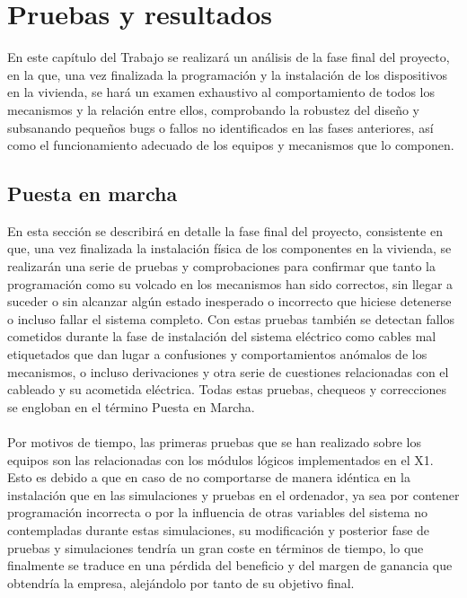 \chapter{Pruebas y resultados}

En este capítulo del Trabajo se realizará un análisis de la fase final del proyecto, en la que, una vez finalizada la programación y la instalación de los dispositivos en la vivienda, se hará un examen exhaustivo al comportamiento de todos los mecanismos y la relación entre ellos,  comprobando la robustez del diseño y subsanando pequeños bugs o fallos no identificados en las fases anteriores, así como el funcionamiento adecuado de los equipos y mecanismos que lo componen.

\section{Puesta en marcha}
En esta sección se describirá en detalle la fase final del proyecto, consistente en que, una vez finalizada la instalación física de los componentes en la vivienda, se realizarán una serie de pruebas y comprobaciones para confirmar que tanto la programación como su volcado en los mecanismos han sido correctos, sin llegar a suceder o sin alcanzar algún estado inesperado o incorrecto que hiciese detenerse o incluso fallar el sistema completo. Con estas pruebas también se detectan fallos cometidos durante la fase de instalación del sistema eléctrico como cables mal etiquetados que dan lugar a confusiones y comportamientos anómalos de los mecanismos, o incluso derivaciones y otra serie de cuestiones relacionadas con el cableado y su acometida eléctrica. Todas estas pruebas, chequeos y correcciones se engloban en el término Puesta en Marcha.\\\\

Por motivos de tiempo, las primeras pruebas que se han realizado sobre los equipos son las relacionadas con los módulos lógicos implementados en el X1. Esto es debido a que en caso de no comportarse de manera idéntica en la instalación que en las simulaciones y pruebas en el ordenador, ya sea por contener programación incorrecta o por la influencia de otras variables del sistema no contempladas durante estas simulaciones, su modificación y posterior fase de pruebas y simulaciones tendría un gran coste en términos de tiempo, lo que finalmente se traduce en una pérdida del beneficio y del margen de ganancia que obtendría la empresa, alejándolo por tanto de su objetivo final.\\\\

